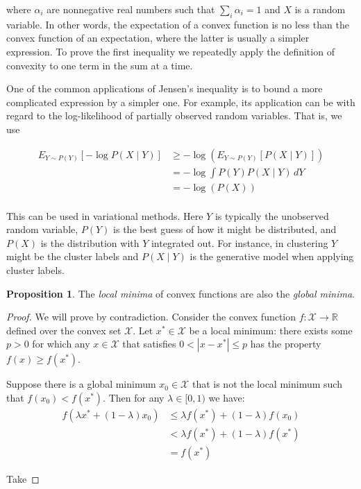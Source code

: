 \documentclass[a4paper,12pt]{article}
\theoremstyle{definition}
\newtheorem*{proposition}{Proposition}
\newcommand{\R}{\mathbb{R}}
\begin{document}
where $\alpha_i$ are nonnegative real numbers such that $\sum_i \alpha_i = 1$ and $X$ is
a random variable. In other words, the expectation of a convex function is no less than
the convex function of an expectation, where the latter is usually a simpler expression.
To prove the first inequality we repeatedly apply the definition of convexity to one term
in the sum at a time.

One of the common applications of Jensen's inequality is to bound a more complicated
expression by a simpler one. For example, its application can be with regard to the
log-likelihood of partially observed random variables. That is, we use


\begin{align*}
    E_{Y \sim P(Y)}[-\log P(X \mid Y)] & \geq -\log(E_{Y \sim P(Y)}[P(X \mid Y)]) \\
                                       & = -\log \int P(Y) P(X \mid Y) \,dY       \\
                                       & = -\log(P(X))                            \\
\end{align*}

This can be used in variational methods. Here $Y$ is typically the unobserved random variable, $P(Y)$ is the best guess of how it might be distributed, and $P(X)$
is the distribution with $Y$ integrated out. For instance, in clustering $Y$ might be the cluster labels and $P(X \mid Y)$ is the generative model when applying cluster labels.

\begin{proposition}
    The \emph{local minima} of convex functions are also the \emph{global minima}.
    \begin{proof}
        We will prove by contradiction.
        Consider the convex function $f: \mathcal{X} \to \R$ defined over the convex set $\mathcal{X}$.
        Let $x^{\ast} \in \mathcal{X}$ be a local minimum: there exists some $p > 0$ for which any
        $x \in \mathcal{X}$ that satisfies $0 < |x - x^{\ast}| \leq p$ has the property $f(x) \geq f(x^*)$.

        Suppose there is a global minimum $x_0 \in \mathcal{X}$ that is not the local minimum such that
        $f(x_0) < f(x^{\ast})$.
        Then for any $\lambda \in [0, 1)$ we have:
        \begin{align*}
            f(\lambda x^\ast+ (1- \lambda)x_0) & \leq \lambda f(x^\ast)+(1-\lambda)f(x_0) \\
                                & < \lambda f(x^\ast)+(1-\lambda)f(x^\ast) \\
                                & = f(x^\ast)
        \end{align*}

        Take

    \end{proof}
\end{proposition}
\end{document}
